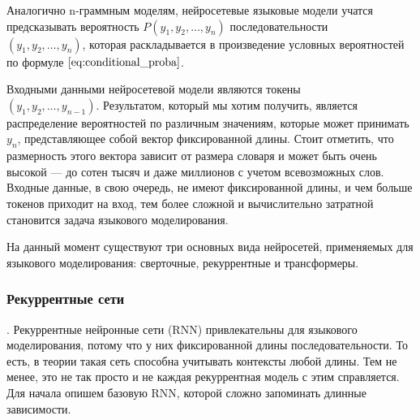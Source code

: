 Аналогично n-граммным моделям, нейросетевые языковые модели учатся предсказывать вероятность $P(y_1, y_2, \dots, y_n)$ последовательности \\ $(y_1, y_2, \dots, y_n)$, которая раскладывается в произведение условных вероятностей по формуле $\ref{eq:conditional_proba}$.

Входными данными нейросетевой модели являются токены \\ $(y_1, y_2, \dots, y_{n-1})$. Результатом, который мы хотим получить, является распределение вероятностей по различным значениям, которые может принимать $y_n$, представляющее собой вектор фиксированной длины. Стоит отметить, что размерность этого вектора зависит от размера словаря и может быть очень высокой --- до сотен тысяч и даже миллионов с учетом всевозможных слов. Входные данные, в свою очередь, не имеют фиксированной длины, и чем больше токенов приходит на вход, тем более сложной и вычислительно затратной становится задача языкового моделирования.

На данный момент существуют три основных вида нейросетей, применяемых для языкового моделирования: сверточные, рекуррентные и трансформеры. ~\cite{neural_lms}

\subsubsection{Рекуррентные сети}. Рекуррентные нейронные сети (RNN) привлекательны для языкового моделирования, потому что у них фиксированной длины последовательности. То есть, в теории такая сеть способна учитывать контексты любой длины. Тем не менее, это не так просто и не каждая рекуррентная модель с этим справляется. Для начала опишем базовую RNN, которой сложно запоминать длинные зависимости.

